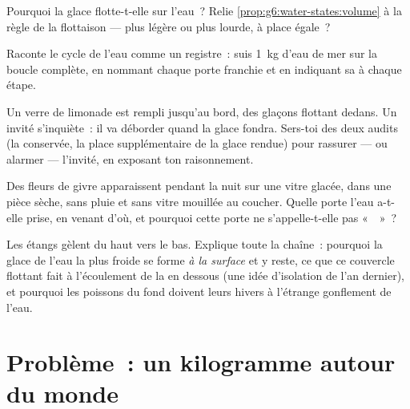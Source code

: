 \begin{exercise}[$\star$]\label{exo:g6:water-states:8}
Pourquoi la glace flotte-t-elle sur l'eau~? Relie
\cref{prop:g6:water-states:volume} à la règle de la flottaison ---
plus légère ou plus lourde, à place égale~?
\end{exercise}

\begin{exercise}[$\star\star$]\label{exo:g6:water-states:9}
Raconte le cycle de l'eau comme un registre~: suis \qty{1}{kg} d'eau
de mer sur la boucle complète, en nommant chaque porte franchie et en
indiquant sa  à chaque étape.
\end{exercise}

\begin{exercise}[$\star\star$]\label{exo:g6:water-states:10}
Un verre de limonade est rempli jusqu'au bord, des glaçons flottant
dedans. Un invité s'inquiète~: il va déborder quand la glace fondra.
Sers-toi des deux audits (la  conservée, la place
supplémentaire de la glace rendue) pour rassurer --- ou alarmer ---
l'invité, en exposant ton raisonnement.
\end{exercise}

\begin{exercise}[$\star\star$]\label{exo:g6:water-states:11}
Des fleurs de givre apparaissent pendant la nuit sur une vitre
glacée, dans une pièce sèche, sans pluie et sans vitre mouillée au
coucher. Quelle porte l'eau a-t-elle prise, en venant d'où, et
pourquoi cette porte ne s'appelle-t-elle pas «~~»~?
\end{exercise}

\begin{exercise}[$\star\star\star$]\label{exo:g6:water-states:12}
Les étangs gèlent du haut vers le bas. Explique toute la chaîne~:
pourquoi la glace de l'eau la plus froide se forme \emph{à la
surface} et y reste, ce que ce couvercle flottant fait à
l'écoulement de la  en dessous (une idée d'isolation de l'an
dernier), et pourquoi les poissons du fond doivent leurs hivers à
l'étrange gonflement de l'eau.
\end{exercise}

\section{Problème~: un kilogramme autour du monde}

